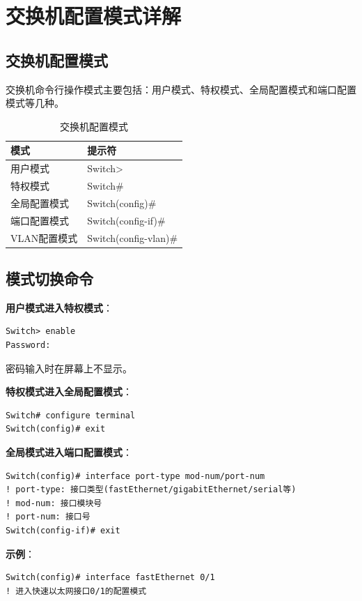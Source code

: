 \documentclass[12pt,a4paper]{ctexart}
\begin{document}
\section{交换机配置模式详解}

\subsection{交换机配置模式}

交换机命令行操作模式主要包括：用户模式、特权模式、全局配置模式和端口配置模式等几种。

\begin{table}[htbp]
\centering
\begin{tabular}{ll}
\toprule
\textbf{模式} & \textbf{提示符} \\
\midrule
用户模式 & Switch> \\
特权模式 & Switch\# \\
全局配置模式 & Switch(config)\# \\
端口配置模式 & Switch(config-if)\# \\
VLAN配置模式 & Switch(config-vlan)\# \\
\bottomrule
\end{tabular}
\caption{交换机配置模式}
\end{table}

\subsection{模式切换命令}

\begin{cmdbox}
\textbf{用户模式进入特权模式}：
\begin{lstlisting}
Switch> enable
Password:
\end{lstlisting}
密码输入时在屏幕上不显示。

\textbf{特权模式进入全局配置模式}：
\begin{lstlisting}
Switch# configure terminal
Switch(config)# exit
\end{lstlisting}

\textbf{全局模式进入端口配置模式}：
\begin{lstlisting}
Switch(config)# interface port-type mod-num/port-num
! port-type: 接口类型(fastEthernet/gigabitEthernet/serial等)
! mod-num: 接口模块号
! port-num: 接口号
Switch(config-if)# exit
\end{lstlisting}

\textbf{示例}：
\begin{lstlisting}
Switch(config)# interface fastEthernet 0/1
! 进入快速以太网接口0/1的配置模式
\end{lstlisting}
\end{cmdbox}
\end{document}
